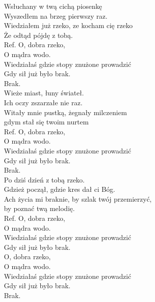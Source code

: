 
Wsłuchany w twą cichą piosenkę \\
Wyszedłem na brzeg pierwszy raz. \\
Wiedziałem już rzeko, ze kocham cię rzeko  \\
Że odtąd pójdę z tobą. \tab{}\\
\hops
Ref. O, dobra rzeko, \tab{}\tab{}\\
 O mądra wodo.\tab{} \tab{}\\
 Wiedziałaś gdzie stopy znużone prowadzić  \\
 Gdy sił już było brak.\tab{} \tab{}\\
 Brak. \tab{}\tab{}\tab{}\\
\hops
Wieże miast, łuny świateł. \\
Ich oczy zszarzałe nie raz. \\
Witały mnie pustką, żegnały milczeniem \\
gdym stał się twoim nurtem \\
\hops
Ref. O, dobra rzeko,\\
 O mądra wodo. \\
 Wiedziałaś gdzie stopy znużone prowadzić \\
 Gdy sił już było brak. \\
 Brak. \\
\hops
Po dziś dzień z tobą rzeko. \\
Gdzież począł, gdzie kres dał ci Bóg. \\
Ach życia mi braknie, by szlak twój przemierzyć, \\
by poznać twą melodię.  \\
\hops
Ref. O, dobra rzeko,\\
 O mądra wodo. \\
 Wiedziałaś gdzie stopy znużone prowadzić \\
 Gdy sił już było brak. \\
\hops
{} O, dobra rzeko,\\
 O mądra wodo. \\
 Wiedziałaś gdzie stopy znużone prowadzić \\
 Gdy sił już było brak. \\
\hop
{} Brak. 

